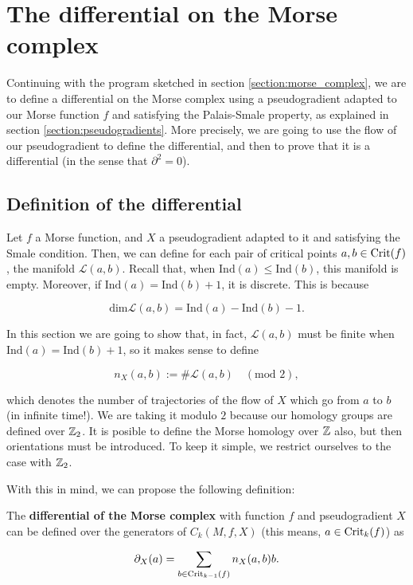 \section{The differential on the Morse complex} \label{section:morse_differential}

Continuing with the program sketched in section \ref{section:morse_complex}, we are to define a differential on the Morse complex using a pseudogradient adapted to our Morse function $f$ and satisfying the Palais-Smale property, as explained in section \ref{section:pseudogradients}. More precisely, we are going to use the flow of our pseudogradient to define the differential, and then to prove that it is a differential (in the sense that $\partial^2 = 0$).

\subsection{Definition of the differential}

Let $f$ a Morse function, and $X$ a pseudogradient adapted to it and satisfying the Smale condition. Then, we can define for each pair of critical points $a, b \in \text{Crit}(f)$, the manifold $\mathcal{L}(a,b)$. Recall that, when $\text{Ind}(a) \leq \text{Ind}(b)$, this manifold is empty. Moreover, if $\text{Ind}(a) = \text{Ind}(b) + 1$, it is discrete. This is because

$$\text{dim} \mathcal{L}(a,b) = \text{Ind}(a) - \text{Ind}(b) - 1 .$$

In this section we are going to show that, in fact, $\mathcal{L}(a,b)$ must be finite when $\text{Ind}(a) = \text{Ind}(b) + 1$, so it makes sense to define

$$n_X(a,b) := \# \mathcal{L}(a,b) \quad (\text{mod } 2),$$

which denotes the number of trajectories of the flow of $X$ which go from $a$ to $b$ (in infinite time!). We are taking it modulo $2$ because our homology groups are defined over $\mathbb{Z}_2$. It is posible to define the Morse homology over $\mathbb{Z}$ also, but then orientations must be introduced. To keep it simple, we restrict ourselves to the case with $\mathbb{Z}_2$.

With this in mind, we can propose the following definition:

\begin{deff}
The {\bf differential of the Morse complex} with function $f$ and pseudogradient $X$ can be defined over the generators of $C_k(M,f,X)$ (this means, $a \in \text{Crit}_k(f)$) as

\begin{displaymath}
\partial_X (a) = \sum_{b \in \text{Crit}_{k-1}(f)} n_X(a,b) b .
\end{displaymath}
\end{deff}


